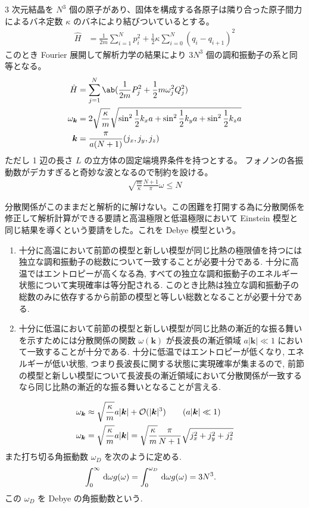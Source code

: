 \documentclass[a4paper,11pt]{jlreq}
\begin{document}
3 次元結晶を $N^3$ 個の原子があり、固体を構成する各原子は隣り合った原子間力によるバネ定数 $\kappa$ のバネにより結びついているとする。
\begin{align}
  \hat{H} & = \frac{1}{2m}\sum_{i=1}^{N}p_i^2 + \frac{1}{2}\kappa\sum_{i=0}^{N}(q_i - q_{i+1})^2
\end{align}
このとき Fourier 展開して解析力学の結果により $3N^3$ 個の調和振動子の系と同等となる。
\begin{align}
  \hat{H}      & = \sum_{j=1}^{N}\ab(\frac{1}{2m}P_j^2 + \frac{1}{2}m\omega_j^2Q_j^2)                                   \\
  \omega_{\kk} & = 2\sqrt{\frac{\kappa}{m}}\sqrt{\sin^2\frac{1}{2}k_xa + \sin^2\frac{1}{2}k_ya + \sin^2\frac{1}{2}k_za} \\
  \kk          & = \frac{\pi}{a(N+1)}(j_x, j_y, j_z)
\end{align}
ただし 1 辺の長さ $L$ の立方体の固定端境界条件を持つとする。
フォノンの各振動数がデカすぎると奇妙な波となるので制約を設ける。
\begin{align}
  \sqrt{\frac{m}{\kappa}}\frac{N+1}{\pi}\omega \leq N
\end{align}

分散関係がこのままだと解析的に解けない。この困難を打開する為に分散関係を修正して解析計算ができる要請と高温極限と低温極限において Einstein 模型と同じ結果を導くという要請をした。これを Debye 模型という。
\begin{enumerate}
  \item 十分に高温において前節の模型と新しい模型が同じ比熱の極限値を持つには独立な調和振動子の総数について一致することが必要十分である.
        十分に高温ではエントロピーが高くなる為, すべての独立な調和振動子のエネルギー状態について実現確率は等分配される. このとき比熱は独立な調和振動子の総数のみに依存するから前節の模型と等しい総数となることが必要十分である.
  \item 十分に低温において前節の模型と新しい模型が同じ比熱の漸近的な振る舞いを示すためには分散関係の関数 $\omega(\bm{k})$ が長波長の漸近領域 $a|\bm{k}| \ll 1$ において一致することが十分である.
        十分に低温ではエントロピーが低くなり, エネルギーが低い状態, つまり長波長に関する状態に実現確率が集まるので, 前節の模型と新しい模型について長波長の漸近領域において分散関係が一致するなら同じ比熱の漸近的な振る舞いとなることが言える.
\end{enumerate}
\begin{align}
  \omega_{\bm{k}} & \approx \sqrt{\frac{\kappa}{m}}a|\bm{k}| + \mathcal{O}(|\bm{k}|^3) \qquad (a|\bm{k}| \ll 1)               \\
  \omega_{\bm{k}} & = \sqrt{\frac{\kappa}{m}}a|\bm{k}| = \sqrt{\frac{\kappa}{m}}\frac{\pi}{N + 1}\sqrt{j_x^2 + j_y^2 + j_z^2}
\end{align}
また打ち切る角振動数 $\omega_D$ を次のように定める.
\begin{align}
  \int_0^\infty\dl{\omega}g(\omega) & = \int_0^{\omega_D}\dl{\omega}g(\omega) = 3N^3.
\end{align}
この $\omega_D$ を Debye の角振動数という.
\end{document}
